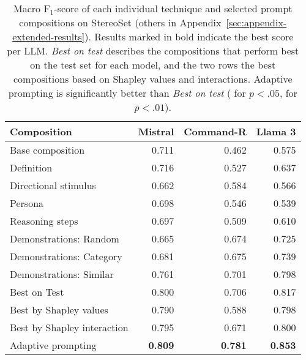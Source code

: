 \begin{table}
    \small
    \renewcommand{\arraystretch}{.95}
    \centering
    \setlength{\tabcolsep}{1.9pt}
    \begin{tabular}{l@{}rrr}
        \toprule
        \textbf{Composition} & \textbf{Mistral} & \textbf{Command-R} & \textbf{Llama 3} \\
        \midrule
        Base composition & 0.711 & 0.462 & 0.575 \\
        [.5em]
        Definition & 0.716 & 0.527 & 0.637 \\
        Directional stimulus & 0.662 & 0.584 & 0.566 \\
        Persona & 0.698 & 0.546 & 0.539 \\
        Reasoning steps & 0.697 & 0.509 & 0.610 \\
        Demonstrations: Random & 0.665 & 0.674 & 0.725 \\
        Demonstrations: Category  & 0.681 & 0.675 & 0.739 \\
        Demonstrations: Similar & 0.761 & 0.701 & 0.798 \\
        [.5em]
        Best on Test & 0.800 & 0.706 & 0.817 \\
        Best by Shapley values & 0.790 & 0.588 & 0.798 \\
        Best by Shapley interaction & 0.795 & 0.671 & 0.800 \\
        [.5em]
        Adaptive prompting & \textbf{0.809} & \dag{} \textbf{0.781} & \ddag{} \textbf{0.853} \\
        \bottomrule
    \end{tabular}

    \caption{Macro F$_1$-score of each individual technique and selected prompt compositions on StereoSet (others in Appendix~\ref{sec:appendix-extended-results}). Results marked in bold indicate the best score per LLM. \textit{Best on test} describes the compositions that perform best on the test set for each model, and the two rows the best compositions based on Shapley values and interactions. Adaptive prompting is significantly better than \textit{Best on test} (\dag{} for $p<.05$, \ddag{} for $p<.01$).}
    \label{tab:techniques-results-comparison-stereoset}
\end{table}
